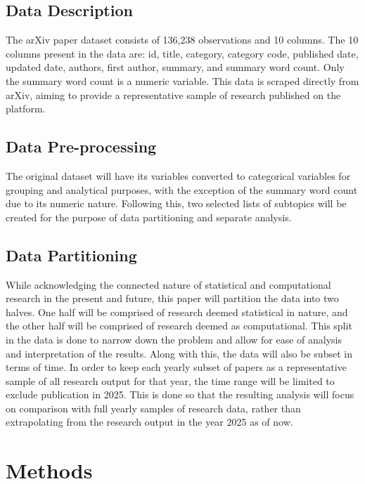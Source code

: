 \documentclass[
  12pt]{article}
\begin{document}
\subsection{Data Description}\label{data-description}

The arXiv paper dataset consists of 136,238 observations and 10 columns.
The 10 columns present in the data are: id, title, category, category
code, published date, updated date, authors, first author, summary, and
summary word count. Only the summary word count is a numeric variable.
This data is scraped directly from arXiv, aiming to provide a
representative sample of research published on the platform.

\subsection{Data Pre-processing}\label{data-pre-processing}

The original dataset will have its variables converted to categorical
variables for grouping and analytical purposes, with the exception of
the summary word count due to its numeric nature. Following this, two
selected lists of subtopics will be created for the purpose of data
partitioning and separate analysis.

\subsection{Data Partitioning}\label{data-partitioning}

While acknowledging the connected nature of statistical and
computational research in the present and future, this paper will
partition the data into two halves. One half will be comprised of
research deemed statistical in nature, and the other half will be
comprised of research deemed as computational. This split in the data is
done to narrow down the problem and allow for ease of analysis and
interpretation of the results. Along with this, the data will also be
subset in terms of time. In order to keep each yearly subset of papers
as a representative sample of all research output for that year, the
time range will be limited to exclude publication in 2025. This is done
so that the resulting analysis will focus on comparison with full yearly
samples of research data, rather than extrapolating from the research
output in the year 2025 as of now.

\section{Methods}\label{sec-meth}
\end{document}

